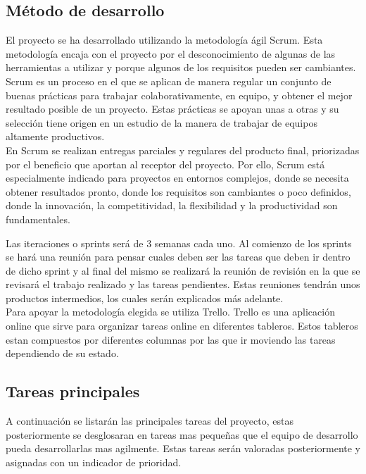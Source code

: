 \subsection{Método de desarrollo}
El proyecto se ha desarrollado utilizando la metodología ágil Scrum\cite{scrum}. Esta metodología encaja con el proyecto por el desconocimiento de algunas de las herramientas a utilizar y porque algunos de los requisitos pueden ser cambiantes.\\

Scrum es un proceso en el que se aplican de manera regular un conjunto de buenas prácticas para trabajar colaborativamente, en equipo, y obtener el mejor resultado posible de un proyecto. Estas prácticas se apoyan unas a otras y su selección tiene origen en un estudio de la manera de trabajar de equipos altamente productivos.\\

En Scrum se realizan entregas parciales y regulares del producto final, priorizadas por el beneficio que aportan al receptor del proyecto. Por ello, Scrum está especialmente indicado para proyectos en entornos complejos, donde se necesita obtener resultados pronto, donde los requisitos son cambiantes o poco definidos, donde la innovación, la competitividad, la flexibilidad y la productividad son fundamentales.\\


Las iteraciones o sprints será de 3 semanas cada uno. Al comienzo de los sprints se hará una reunión para pensar cuales deben ser las tareas que deben ir dentro de dicho sprint y al final del mismo se realizará la reunión de revisión en la que se revisará el trabajo realizado y las tareas pendientes. Estas reuniones tendrán unos productos intermedios, los cuales serán explicados más adelante.\\

Para apoyar la metodología elegida se utiliza Trello\cite{trello}. Trello es una aplicación online que sirve para organizar tareas online en diferentes tableros. Estos tableros estan compuestos por diferentes columnas por las que ir moviendo las tareas dependiendo de su estado.

\subsection{Tareas principales}
A continuación se listarán las principales tareas del proyecto, estas posteriormente se desglosaran en tareas mas pequeñas que el equipo de desarrollo pueda desarrollarlas mas agilmente. Estas tareas serán valoradas posteriormente y asignadas con un indicador de prioridad.

